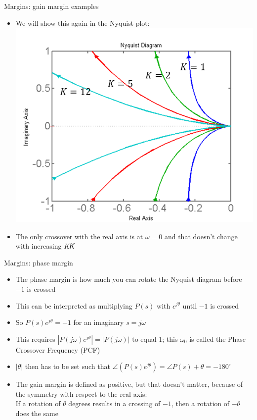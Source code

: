 \begin{frame}{Margins: gain margin examples}
\begin{itemize}
\item We will show this again in the Nyquist plot:
\\ \includegraphics[width=0.7\linewidth]{Afbeelding20}
\item The only crossover with the real axis is at $\omega=0$ and that doesn't change with increasing $K$𝐾
\end{itemize}
\end {frame}

\begin{frame}{Margins: phase margin}
\begin{itemize}
\item The phase margin is how much you can rotate the Nyquist diagram before $-1$ is crossed
\item This can be interpreted as multiplying $P(s)$ with $e^{j\theta}$ until $-1$ is crossed
\item So $P(s)e^{j\theta} = -1$ for an imaginary $s=j\omega$
\item This requires $|P(j\omega)e^{j\theta}| = |P(j\omega)|$ to equal 1; this $\omega_0$ is called the Phase Crossover Frequency (PCF)
\item $|\theta|$ then has to be set such that $\angle(P(s)e^{j\theta}) = \angle P(s) +\theta = -180^{\circ}$
\item The gain margin is defined as positive, but that doesn’t matter, because of the symmetry with respect to the real axis: 
\\If a rotation of $\theta$ degrees results in a crossing of $-1$, then a rotation of $-\theta$ does the same  
\end{itemize}
\end {frame}

